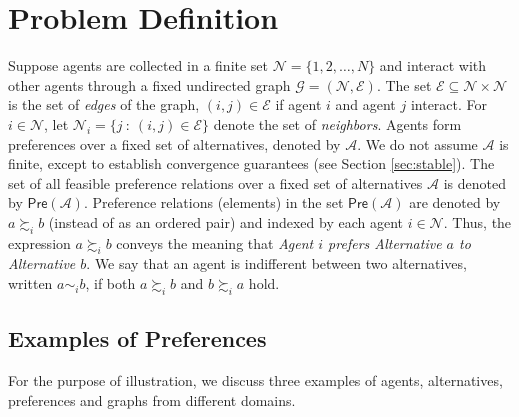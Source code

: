 \documentclass[conference]{ieeeconf}
\newcommand{\N}{\mathcal{N}}
\newcommand{\A}{\mathcal{A}}
\newcommand{\E}{\mathcal{E}}
\newcommand{\Pref}{\mathsf{Pre}}
\newcommand{\prefers}{\succsim}
\newcommand{\indif}{\sim}
\newcommand{\graph}{\mathcal{G}}
\begin{document}
\section{Problem Definition}
\label{sec:problem}
\vspace{-0.25em}
Suppose agents are collected in a finite set $\N = \{1,2,\dots,N\}$ and interact with other agents through a fixed undirected graph $\graph = (\N,\E)$. The set $\E \subseteq \N \times \N$ is the set of \emph{edges} of the graph, $(i,j) \in \E$ if agent $i$ and agent $j$ interact. For $i \in \N$, let $\N_i = \{ j~:~(i,j) \in \E\}$ denote the set of \emph{neighbors}. Agents form preferences over a fixed set of alternatives, denoted by $\A$. We do not assume $\A$ is finite, except to establish convergence guarantees (see Section \ref{sec:stable}). The set of all feasible preference relations over a fixed set of alternatives $\A$ is denoted by $\Pref(\A)$. Preference relations (elements) in the set $\Pref(\A)$ are denoted by $a \prefers_i b$ (instead of as an ordered pair) and indexed by each agent $i \in \N$. Thus, the expression $a \prefers_i b$ conveys the meaning that \emph{Agent $i$ prefers Alternative $a$ to Alternative $b$}. We say that an agent is indifferent between two alternatives, written $a \indif_i b$, if both $a \prefers_i b$ and $b \prefers_i a$ hold.

\subsection{Examples of Preferences}

For the purpose of illustration, we discuss three examples of agents, alternatives, preferences and graphs from different domains.
\end{document}
